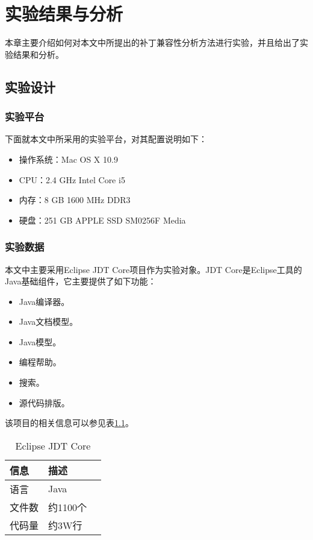 \chapter{实验结果与分析}
\label {exp}
本章主要介绍如何对本文中所提出的补丁兼容性分析方法进行实验，并且给出了实验结果和分析。
\section{实验设计}
\subsection{实验平台}
下面就本文中所采用的实验平台，对其配置说明如下：
\begin{itemize}
	\item 操作系统：Mac OS X 10.9
	\item CPU：2.4 GHz Intel Core i5
	\item 内存：8 GB 1600 MHz DDR3
	\item 硬盘：251 GB APPLE SSD SM0256F Media
\end{itemize}
\subsection{实验数据}

本文中主要采用Eclipse JDT Core项目作为实验对象。JDT Core是Eclipse工具的Java基础组件，它主要提供了如下功能：
\begin{itemize}
	\item Java编译器。
	\item Java文档模型。
	\item Java模型。
	\item 编程帮助。
	\item 搜索。
	\item 源代码排版。
\end{itemize}

该项目的相关信息可以参见表\ref {jdt_core}。

\begin{table}
	\caption{Eclipse JDT Core}
	\label{jdt_core}
	\centering
	\begin{tabular}{llc}
		\toprule[1.5pt]
		{\heiti 信息} & {\heiti 描述} \\\midrule[1pt]
		语言 & Java \\
		文件数 & 约1100个\\
		代码量 & 约3W行\\
		\bottomrule[1.5pt]
	\end{tabular}
\end{table}

